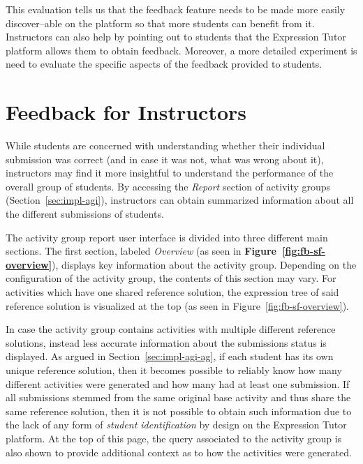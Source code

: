 \begin{chapterBody}
This evaluation tells us that the feedback feature needs to be made more easily
discover–able on the platform so that more students can benefit from it.
Instructors can also help by pointing out to students that the Expression Tutor
platform allows them to obtain feedback.
Moreover, a more detailed experiment is need to evaluate the specific aspects
of the feedback provided to students.

\section{Feedback for Instructors}\label{sec:fb-sf}

While students are concerned with understanding whether their individual
submission was correct (and in case it was not, what was wrong about it), 
instructors may find it more insightful to understand the performance of the
overall group of students.
By accessing the \textit{Report} section of activity groups
(Section~\ref{sec:impl-agi}), instructors can obtain summarized information
about all the different submissions of students.

The activity group report user interface is divided into three different
main sections. The first section, labeled \textit{Overview} (as seen in
\textbf{Figure~\ref{fig:fb-sf-overview}}), displays key information about the
activity group. Depending on the configuration of the activity group, the
contents of this section may vary. For activities which have one shared
reference solution, the expression tree of said reference solution is visualized
at the top (as seen in Figure~\ref{fig:fb-sf-overview}).

In case the activity group contains activities with multiple different
reference solutions, instead less accurate information about the submissions
status is displayed.
As argued in Section~\ref{sec:impl-agi-ag}, if each student has its own unique
reference solution, then it becomes possible to reliably know how many different
activities were generated and how many had at least one submission. If all
submissions stemmed from the same original base activity and thus share the same
reference solution, then it is not possible to obtain such information due to the
lack of any form of \textit{student identification} by design on the Expression
Tutor platform. 
At the top of this page, the query associated to the activity group is also
shown to provide additional context as to how the activities were generated.


\end{chapterBody}
